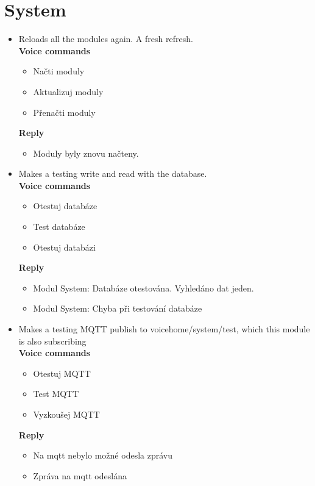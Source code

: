 \section{System}\label{section:app_system}

\begin{itemize}
    \item Reloads all the modules again. A fresh refresh.\\
    \textbf{Voice commands}
    \begin{itemize}
        \item Načti moduly
        \item Aktualizuj moduly
        \item Přenačti moduly
    \end{itemize}
    \textbf{Reply}
    \begin{itemize}
        \item Moduly byly znovu načteny.
    \end{itemize}
    \item Makes a testing write and read with the database.\\
    \textbf{Voice commands}
    \begin{itemize}
        \item Otestuj databáze
        \item Test databáze
        \item Otestuj databázi
    \end{itemize}
    \textbf{Reply}
    \begin{itemize}
        \item Modul System: Databáze otestována. Vyhledáno dat jeden.
        \item Modul System: Chyba při testování databáze
    \end{itemize}
    \item Makes a testing MQTT publish to voicehome/system/test, which this module is also subscribing\\
    \textbf{Voice commands}
    \begin{itemize}
        \item Otestuj MQTT
        \item Test MQTT
        \item Vyzkoušej MQTT
    \end{itemize}
    \textbf{Reply}
    \begin{itemize}
        \item Na mqtt nebylo možné odesla zprávu
        \item Zpráva na mqtt odeslána

\end{itemize}
\end{itemize}
